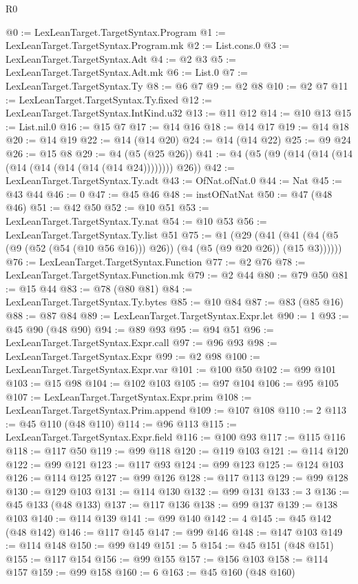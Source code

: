 \begin{lexlean}{R0}
\begin{coremodule}
@0 := LexLeanTarget.TargetSyntax.Program
@1 := LexLeanTarget.TargetSyntax.Program.mk
@2 := List.cons.{0}
@3 := LexLeanTarget.TargetSyntax.Adt
@4 := @2 @3
@5 := LexLeanTarget.TargetSyntax.Adt.mk
@6 := List.{0}
@7 := LexLeanTarget.TargetSyntax.Ty
@8 := @6 @7
@9 := @2 @8
@10 := @2 @7
@11 := LexLeanTarget.TargetSyntax.Ty.fixed
@12 := LexLeanTarget.TargetSyntax.IntKind.u32
@13 := @11 @12
@14 := @10 @13
@15 := List.nil.{0}
@16 := @15 @7
@17 := @14 @16
@18 := @14 @17
@19 := @14 @18
@20 := @14 @19
@22 := @14 (@14 @20)
@24 := @14 (@14 @22)
@25 := @9 @24
@26 := @15 @8
@29 := @4 (@5 (@25 @26))
@41 := @4 (@5 (@9 (@14 (@14 (@14 (@14 (@14 (@14 (@14 (@14 @24)))))))) @26))
@42 := LexLeanTarget.TargetSyntax.Ty.adt
@43 := OfNat.ofNat.{0}
@44 := Nat
@45 := @43 @44
@46 := 0
@47 := @45 @46
@48 := instOfNatNat
@50 := @47 (@48 @46)
@51 := @42 @50
@52 := @10 @51
@53 := LexLeanTarget.TargetSyntax.Ty.nat
@54 := @10 @53
@56 := LexLeanTarget.TargetSyntax.Ty.list @51
@75 := @1
    (@29 (@41 (@41 (@4 (@5 (@9 (@52 (@54 (@10 @56 @16))) @26)) (@4 (@5 (@9 @20 @26)) (@15 @3))))))
@76 := LexLeanTarget.TargetSyntax.Function
@77 := @2 @76
@78 := LexLeanTarget.TargetSyntax.Function.mk
@79 := @2 @44
@80 := @79 @50
@81 := @15 @44
@83 := @78 (@80 @81)
@84 := LexLeanTarget.TargetSyntax.Ty.bytes
@85 := @10 @84
@87 := @83 (@85 @16)
@88 := @87 @84
@89 := LexLeanTarget.TargetSyntax.Expr.let
@90 := 1
@93 := @45 @90 (@48 @90)
@94 := @89 @93
@95 := @94 @51
@96 := LexLeanTarget.TargetSyntax.Expr.call
@97 := @96 @93
@98 := LexLeanTarget.TargetSyntax.Expr
@99 := @2 @98
@100 := LexLeanTarget.TargetSyntax.Expr.var
@101 := @100 @50
@102 := @99 @101
@103 := @15 @98
@104 := @102 @103
@105 := @97 @104
@106 := @95 @105
@107 := LexLeanTarget.TargetSyntax.Expr.prim
@108 := LexLeanTarget.TargetSyntax.Prim.append
@109 := @107 @108
@110 := 2
@113 := @45 @110 (@48 @110)
@114 := @96 @113
@115 := LexLeanTarget.TargetSyntax.Expr.field
@116 := @100 @93
@117 := @115 @116
@118 := @117 @50
@119 := @99 @118
@120 := @119 @103
@121 := @114 @120
@122 := @99 @121
@123 := @117 @93
@124 := @99 @123
@125 := @124 @103
@126 := @114 @125
@127 := @99 @126
@128 := @117 @113
@129 := @99 @128
@130 := @129 @103
@131 := @114 @130
@132 := @99 @131
@133 := 3
@136 := @45 @133 (@48 @133)
@137 := @117 @136
@138 := @99 @137
@139 := @138 @103
@140 := @114 @139
@141 := @99 @140
@142 := 4
@145 := @45 @142 (@48 @142)
@146 := @117 @145
@147 := @99 @146
@148 := @147 @103
@149 := @114 @148
@150 := @99 @149
@151 := 5
@154 := @45 @151 (@48 @151)
@155 := @117 @154
@156 := @99 @155
@157 := @156 @103
@158 := @114 @157
@159 := @99 @158
@160 := 6
@163 := @45 @160 (@48 @160)

\end{coremodule}
\end{lexlean}
